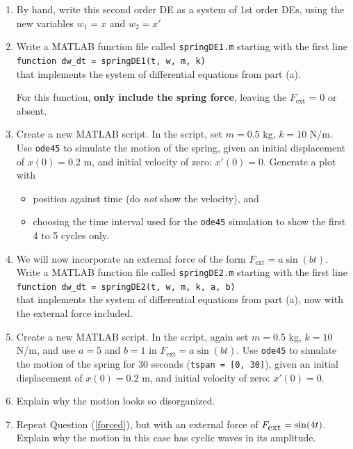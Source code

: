\begin{enumerate}
\begin{Question}
\begin{enumerate}
\item By hand, write this second order DE as a system of 1st order
  DEs, using the new variables $w_1 = x$ and $w_2 = x'$

\item Write a MATLAB function file called \verb#springDE1.m# starting
  with the first line \\
\verb#function dw_dt = springDE1(t, w, m, k)# \\
  that implements the system of differential equations from part (a).

  For this function, {\bf only include the spring force}, leaving the
  $F_{\mbox{ext}}$ = 0 or absent.

\item Create a new MATLAB script.  In the script, set $m =0.5$ kg, $k =
  10$ N/m. Use \verb#ode45# to simulate the motion of the spring,
  given an initial displacement of $x(0) = 0.2$ m, and initial
  velocity of zero: $x'(0) = 0$.  Generate a plot with
\begin{itemize}
\item position against time (do {\em not} show the velocity), and
\item choosing the time interval used for the \verb#ode45# simulation
  to show the first 4 to 5 cycles only.
\end{itemize}

\item We will now incorporate an external force of the form
  $F_{\mbox{ext}} = a \sin(b t)$. Write a MATLAB function file called
  \verb#springDE2.m# starting with the first line \\
  \verb#function dw_dt = springDE2(t, w, m, k, a, b)# \\
that implements
  the system of differential equations from part (a), now with the
  external force included.

\item Create a new MATLAB script.  In the script, again set $m =0.5$
  kg, $k = 10$ N/m, and use $a = 5$ and $b = 1$ in $F_{\mbox{ext}} = a
  \sin(bt)$.  Use \verb#ode45# to simulate the motion of the spring
  for 30 seconds (\verb#tspan = [0, 30]#), given an initial
  displacement of $x(0) = 0.2$ m, and initial velocity of zero: $x'(0)
  = 0$. \label{forced}

\item Explain why the motion looks so disorganized.

\item Repeat Question (\ref{forced}), but with an external force of
  $F_{\mbox{ext}} = \sin(4 t)$. Explain why the motion in this case has cyclic
  waves in its amplitude.



\end{enumerate}
\end{Question}
\end{enumerate}
